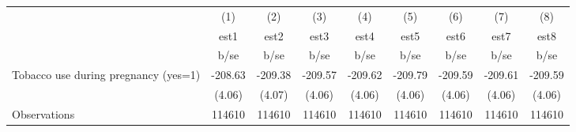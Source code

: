 {
\def\sym#1{\ifmmode^{#1}\else\(^{#1}\)\fi}
\begin{tabular}{l*{8}{c}}
\hline\hline
                                                  &\multicolumn{1}{c}{(1)}&\multicolumn{1}{c}{(2)}&\multicolumn{1}{c}{(3)}&\multicolumn{1}{c}{(4)}&\multicolumn{1}{c}{(5)}&\multicolumn{1}{c}{(6)}&\multicolumn{1}{c}{(7)}&\multicolumn{1}{c}{(8)}\\
                                                  &        est1&        est2&        est3&        est4&        est5&        est6&        est7&        est8\\
                                                  &        b/se&        b/se&        b/se&        b/se&        b/se&        b/se&        b/se&        b/se\\
\hline
Tobacco use during pregnancy (yes=1)              &     -208.63&     -209.38&     -209.57&     -209.62&     -209.79&     -209.59&     -209.61&     -209.59\\
                                                  &      (4.06)&      (4.07)&      (4.06)&      (4.06)&      (4.06)&      (4.06)&      (4.06)&      (4.06)\\
\hline
Observations                                      &      114610&      114610&      114610&      114610&      114610&      114610&      114610&      114610\\
\hline\hline
\end{tabular}
}
